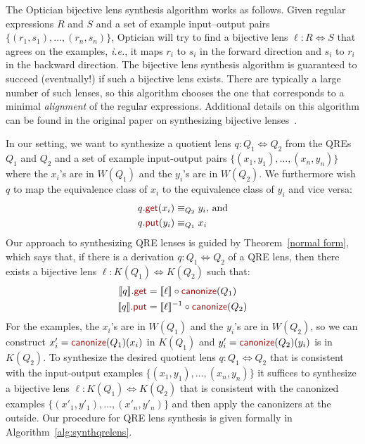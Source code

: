 \documentclass[acmsmall,review,anonymous]{acmart}
\newcommand{\kw}[1]{\textcolor{dkred}{\ensuremath{\mathsf{#1}}}}
\newcommand{\canonize}{\ensuremath{\kw{canonize}}}
\newcommand{\get}{\ensuremath{\kw{get}}}
\newcommand{\lput}{\ensuremath{\kw{put}}}
\begin{document}
The Optician bijective lens synthesis algorithm works as follows. Given regular
expressions $R$ and $S$ and a set of example input--output pairs $\{(r_1,
s_1),\allowbreak \ldots,\allowbreak (r_n, s_n)\}$, Optician will try to find a
bijective lens $\ell : R \Leftrightarrow S$ that agrees on the examples,
\textit{i.e.}, it maps $r_i$ to $s_i$ in the forward direction and $s_i$ to
$r_i$ in the backward direction. The bijective lens synthesis algorithm is
guaranteed to succeed (eventually!) if such a bijective lens exists. There are
typically a large number of such lenses, so this algorithm chooses the one that
corresponds to a minimal \emph{alignment} of the regular expressions. Additional
details on this algorithm can be found in the original paper on synthesizing
bijective lenses~\cite{optician}.

In our setting, we want to synthesize a quotient lens $q: Q_1 \Leftrightarrow
Q_2$ from the QREs $Q_1$ and $Q_2$ and a set of example input-output pairs
$\{(x_1, y_1),\allowbreak \ldots,\allowbreak (x_n, y_n)\}$ where the $x_i$'s are
in $W(Q_1)$ and the $y_i$'s are in $W(Q_2)$. We furthermore wish $q$ to map the
equivalence class of $x_i$ to the equivalence class of $y_i$ and vice versa:
\begin{align*}
q.\get(x_i) &\equiv_{Q_2} y_i \text{, and}\\
q.\lput(y_i) &\equiv_{Q_1} x_i
\end{align*}
Our approach to synthesizing QRE lenses is guided by Theorem~\ref{normal form},
which says that, if there is a derivation $q : Q_1 \Leftrightarrow Q_2$ of a
QRE lens, then there exists a bijective lens $\ell : K(Q_1) \Leftrightarrow
K(Q_2)$ such that:
\begin{align*}
\llbracket q \rrbracket.\get &= \llbracket \ell \rrbracket\circ \canonize(Q_1)\\
\llbracket q \rrbracket.\lput &= \llbracket \ell \rrbracket^{-1} \circ
\canonize(Q_2)
\end{align*}
For the examples, the $x_i$'s are in $W(Q_1)$ and the $y_i$'s are 
in $W(Q_2)$, so we can construct ${x'_i} = \canonize(Q_1)(x_i)$ in $K(Q_1)$
and ${y'_i} = \canonize(Q_2)(y_i)$ is in $K(Q_2)$. To synthesize the desired
quotient lens $q: Q_1 \Leftrightarrow Q_2$ that is consistent with the
input-output examples $\{(x_1, y_1), \ldots, (x_n, y_n)\}$ it suffices to
synthesize a bijective lens $\ell : K(Q_1) \Leftrightarrow K(Q_2)$ that is
consistent with the canonized examples $\{({x'_1}, {y'_1}), \ldots, ({x'_n},
{y'_n})\}$ and then apply the canonizers at the outside. Our procedure for QRE
lens synthesis is given formally in Algorithm~\ref{alg:synthqrelens}.
\end{document}
